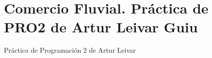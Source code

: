 \chapter{Comercio Fluvial. Práctica de PRO2 de Artur Leivar Guiu}
\hypertarget{index}{}\label{index}
Práctica de Programación 2 de Artur Leivar 